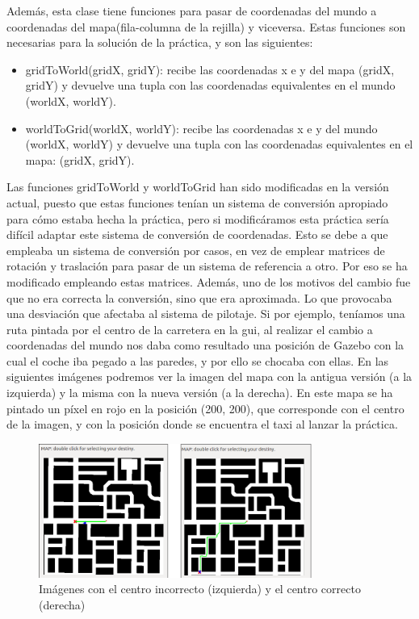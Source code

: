 Además, esta clase tiene funciones para pasar de coordenadas del mundo a coordenadas del mapa(fila-columna de la rejilla) y viceversa. Estas funciones son necesarias para la solución de la práctica, y son las siguientes:

\begin{itemize}
\item gridToWorld(gridX, gridY): recibe las coordenadas x e y del mapa (gridX, gridY) y devuelve una tupla con las coordenadas equivalentes en el mundo (worldX, worldY).
\item worldToGrid(worldX, worldY): recibe las coordenadas x e y del mundo (worldX, worldY) y devuelve una tupla con las coordenadas equivalentes en el mapa: (gridX, gridY).

\end{itemize}

Las funciones gridToWorld y worldToGrid han sido modificadas en la versión actual, puesto que estas funciones tenían un sistema de conversión apropiado para cómo estaba hecha la práctica, pero si modificáramos esta práctica sería difícil adaptar este sistema de conversión de coordenadas. Esto se debe a que empleaba un sistema de conversión por casos, en vez de emplear matrices de rotación y traslación para pasar de un sistema de referencia a otro. Por eso se ha modificado empleando estas matrices. Además, uno de los motivos del cambio fue que no era correcta la conversión, sino que era aproximada. Lo que provocaba una desviación que afectaba al sistema de pilotaje. Si por ejemplo, teníamos una ruta pintada por el centro de la carretera en la \acrshort{gui}, al realizar el cambio a coordenadas del mundo nos daba como resultado una posición de Gazebo con la cual el coche iba pegado a las paredes, y por ello se chocaba con ellas. En las siguientes imágenes podremos ver la imagen del mapa con la antigua versión (a la izquierda) y la misma con la nueva versión (a la derecha). En este mapa se ha pintado un píxel en rojo en la posición (200, 200), que corresponde con el centro de la imagen, y con la posición donde se encuentra el taxi al lanzar la práctica. 

\begin{figure}[H]
  \begin{center}
    \includegraphics[width=0.8\textwidth]{figures/GPP/centros.png}
		\caption{Imágenes con el centro incorrecto (izquierda) y el centro correcto (derecha)}
		\label{fig.centros}
		\end{center}
\end{figure}

